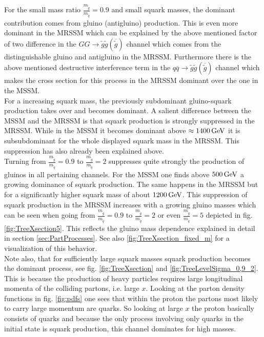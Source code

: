 For the small mass ratio $\frac{m_{\tilde{g}}}{m_{\tilde{q}}} = 0.9$ and small squark masses, the dominant contribution comes from gluino (antigluino) production. This is even more dominant in the MRSSM which can be explained by the above mentioned factor of two difference in the $GG \to \tilde{g}\tilde{g}(\overline{\tilde{g}})$ channel which comes from the distinguishable gluino and antigluino in the MRSSM. Furthermore there is the above mentioned destructive interference term in the $q\overline{q} \to \tilde{g}\tilde{g}(\overline{\tilde{g}})$ channel which makes the cross section for this process in the MRSSM dominant over the one in the MSSM.\\
For a increasing squark mass, the previously subdominant gluino-squark production takes over and becomes dominant. A salient difference between the MSSM and the MRSSM is that squark production is strongly suppressed in the MRSSM. While in the MSSM it becomes dominant above  $\approx \unit[1400]{GeV}$ it is subsubdominant for the whole displayed squark mass in the MRSSM. This suppression has also already been explained above.\\
Turning from $\frac{m_{\tilde{g}}}{m_{\tilde{q}}} = 0.9$ to $\frac{m_{\tilde{g}}}{m_{\tilde{q}}} = 2$ suppresses quite strongly the production of gluinos in all pertaining channels. For the MSSM one finds above $\unit[500]{GeV}$ a growing dominance of squark production. The same happens in the MRSSM but for a significantly higher squark mass of about $\unit[1200]{GeV}$. This suppression of squark production in the MRSSM increases with a growing gluino masses which can be seen when going from $\frac{m_{\tilde{g}}}{m_{\tilde{q}}} = 0.9$ to  $\frac{m_{\tilde{g}}}{m_{\tilde{q}}} = 2$ or even $\frac{m_{\tilde{g}}}{m_{\tilde{q}}} = 5$ depicted in fig. \ref{fig:TreeXsection5}. This reflects the gluino mass dependence explained in detail in section \ref{sec:PartProcesses}. See also \ref{fig:TreeXsection_fixed_m} for a visualization of this behavior.\\
Note also, that for sufficiently large squark masses squark production becomes the dominant process, see fig. \ref{fig:TreeXsection} and \ref{fig:TreeLevelSigma_0,9_2}. This is because the production of heavy particles requires large longitudinal momenta of the colliding partons, i.e. large $x$. Looking at the parton density functions in fig. \ref{fig:pdfs} one sees that within the proton the partons most likely to carry large momentum are quarks. So looking at large $x$ the proton basically consists of quarks and because the only process involving only quarks in the initial state is squark production, this channel dominates for high masses.\\
